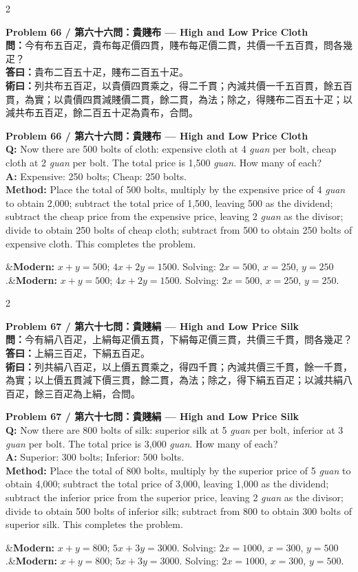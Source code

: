 \documentclass[11pt,a4paper]{article}
\newcommand{\bilingualproblem}[4]{%
  \begin{paracol}{2}
  \begin{leftcolumn}
  \noindent\textbf{\color{problemcolor}#1}\\[0.2cm]
  #2
  \end{leftcolumn}
  \switchcolumn
  \noindent\textbf{\color{problemcolor}#1}\\[0.2cm]
  #3
  \end{paracol}
  \ifx&#4&\else\vspace{0.3cm}\noindent#4\fi
  \vspace{0.5cm}
}
\newcommand{\wen}[1]{\textcolor{problemcolor}{\textbf{問：}}#1}
\newcommand{\da}[1]{\textcolor{answercolor}{\textbf{答曰：}}#1}
\newcommand{\shu}[1]{\textcolor{methodcolor}{\textbf{術曰：}}#1}
\newcommand{\wenen}[1]{\textcolor{problemcolor}{\textbf{Q:}} #1}
\newcommand{\daen}[1]{\textcolor{answercolor}{\textbf{A:}} #1}
\newcommand{\shuen}[1]{\textcolor{methodcolor}{\textbf{Method:}} #1}
\begin{document}
\newpage

\bilingualproblem{Problem 66 / 第六十六問：貴賤布 --- High and Low Price Cloth}{
\wen{今有布五百疋，貴布每疋價四貫，賤布每疋價二貫，共價一千五百貫，問各幾疋？}\\[0.2cm]
\da{貴布二百五十疋，賤布二百五十疋。}\\[0.2cm]
\shu{列共布五百疋，以貴價四貫乘之，得二千貫；內減共價一千五百貫，餘五百貫，為實；以貴價四貫減賤價二貫，餘二貫，為法；除之，得賤布二百五十疋；以減共布五百疋，餘二百五十疋為貴布，合問。}
}{
\wenen{Now there are 500 bolts of cloth: expensive cloth at 4 \textit{guan} per bolt, cheap cloth at 2 \textit{guan} per bolt. The total price is 1,500 \textit{guan}. How many of each?}\\[0.2cm]
\daen{Expensive: 250 bolts; Cheap: 250 bolts.}\\[0.2cm]
\shuen{Place the total of 500 bolts, multiply by the expensive price of 4 \textit{guan} to obtain 2,000; subtract the total price of 1,500, leaving 500 as the dividend; subtract the cheap price from the expensive price, leaving 2 \textit{guan} as the divisor; divide to obtain 250 bolts of cheap cloth; subtract from 500 to obtain 250 bolts of expensive cloth. This completes the problem.}
}{\textbf{Modern:} $x + y = 500$; $4x + 2y = 1500$. Solving: $2x = 500$, $x = 250$, $y = 250$.}

\bilingualproblem{Problem 67 / 第六十七問：貴賤絹 --- High and Low Price Silk}{
\wen{今有絹八百疋，上絹每疋價五貫，下絹每疋價三貫，共價三千貫，問各幾疋？}\\[0.2cm]
\da{上絹三百疋，下絹五百疋。}\\[0.2cm]
\shu{列共絹八百疋，以上價五貫乘之，得四千貫；內減共價三千貫，餘一千貫，為實；以上價五貫減下價三貫，餘二貫，為法；除之，得下絹五百疋；以減共絹八百疋，餘三百疋為上絹，合問。}
}{
\wenen{Now there are 800 bolts of silk: superior silk at 5 \textit{guan} per bolt, inferior at 3 \textit{guan} per bolt. The total price is 3,000 \textit{guan}. How many of each?}\\[0.2cm]
\daen{Superior: 300 bolts; Inferior: 500 bolts.}\\[0.2cm]
\shuen{Place the total of 800 bolts, multiply by the superior price of 5 \textit{guan} to obtain 4,000; subtract the total price of 3,000, leaving 1,000 as the dividend; subtract the inferior price from the superior price, leaving 2 \textit{guan} as the divisor; divide to obtain 500 bolts of inferior silk; subtract from 800 to obtain 300 bolts of superior silk. This completes the problem.}
}{\textbf{Modern:} $x + y = 800$; $5x + 3y = 3000$. Solving: $2x = 1000$, $x = 300$, $y = 500$.}
\end{document}
